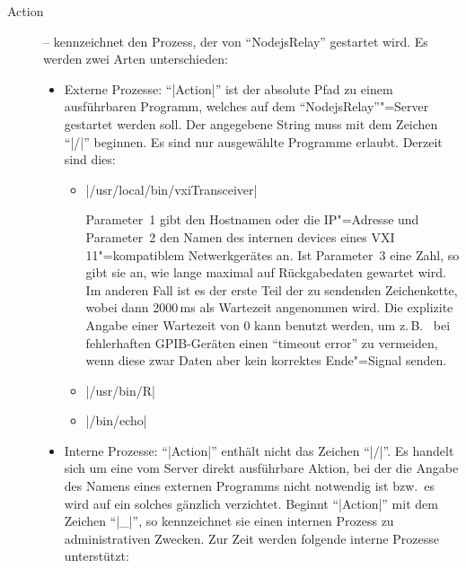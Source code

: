\documentclass[%
fontsize=11pt
,paper=a4
,twoside
,headings=normal
,pagesize
]{scrartcl}
\begin{document}
\begin{description}

  \item[Action] -- kennzeichnet den Prozess, der von "`NodejsRelay"'
  gestartet wird. Es werden zwei Arten unterschieden:
  
  \begin{itemize}

    \item Externe Prozesse: "`|Action|"' ist der absolute Pfad zu
    einem ausführbaren Programm, welches auf dem "`NodejsRelay"'"=Server
    gestartet werden soll. Der angegebene String muss mit dem Zeichen
    "`|/|"' beginnen. Es sind nur
    ausgewählte Programme erlaubt. Derzeit sind dies:
    \begin{itemize}

    \item |/usr/local/bin/vxiTransceiver| \par
    
      Parameter~1 gibt den Hostnamen oder die IP"=Adresse und
      Parameter~2 den Namen des internen devices eines
      VXI\,11"=kompatiblem Netwerkgerätes an. Ist Parameter~3 eine
      Zahl, so gibt sie an, wie lange maximal auf Rückgabedaten
      gewartet wird. Im anderen Fall ist es der erste Teil der zu
      sendenden Zeichenkette, wobei dann 2000\,ms als Wartezeit
      angenommen wird. Die explizite Angabe einer Wartezeit von 0
      kann benutzt werden, um z.\,B. \ bei fehlerhaften
      GPIB-Geräten einen "`timeout error"' zu vermeiden, wenn diese
      zwar Daten aber kein korrektes Ende"=Signal senden.
      
    \item |/usr/bin/R|
    \item |/bin/echo|

    \end{itemize}

    \item Interne Prozesse: "`|Action|"' enthält nicht das Zeichen
    "`|/|"'. Es handelt sich um eine vom Server direkt ausführbare
    Aktion, bei der die Angabe des Namens eines externen Programms
    nicht notwendig ist bzw.\ es wird auf ein solches gänzlich
    verzichtet. Beginnt "`|Action|"' mit
    dem Zeichen "`|_|"', so kennzeichnet sie einen internen Prozess
    zu administrativen Zwecken. Zur Zeit werden folgende interne
    Prozesse unterstützt:

    \begin{itemize}
    

\end{itemize}
\end{itemize}
\end{description}
\end{document}
